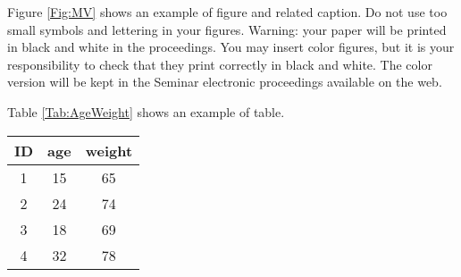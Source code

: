 
Figure \ref{Fig:MV} shows an example of figure and related
caption.  Do not use too small symbols and lettering in your
figures.  Warning: your paper will be printed in black and white
in the proceedings.  You may insert color figures, but it is your
responsibility to check that they print correctly in black and
white.  The color version will be kept in the Seminar electronic
proceedings available on the web.

\begin{figure}[ht]
\centering
\end{figure}

Table \ref{Tab:AgeWeight} shows an example of table.

\begin{table}[h!]
  \centering
  \begin{tabular}{|c|c|c|}
    \hline
    ID & age & weight \\
    \hline
    1& 15 & 65 \\
    2& 24 & 74\\
    3& 18 & 69 \\
    4& 32 & 78 \\
    \hline
  \end{tabular}
\end{table}